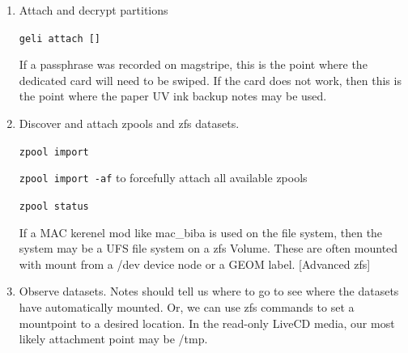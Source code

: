 \begin{enumerate}
If the disks are hardware encrypted, then provide the PIN according to the manufacturer's directions.  Enter the PIN carefully, as there may be administrative reset or disk-wiping functions available.  With the disk hardware decrypted and attached, a message should be visible on the console describing the detection of the device.

\texttt{geom disk list} - should show the disks recognized by the system.

\texttt{gpart show} - should provide an indicator of \gls{partition} numbers

\item Attach and decrypt partitions

\texttt{geli attach []}

If a \gls{passphrase} was recorded on magstripe, this is the point where the dedicated card will need to be swiped.  If the card does not work, then this is the point where the paper UV ink \gls{backup} notes may be used.

\item Discover and attach zpools and \gls{zfs} datasets.

\texttt{zpool import }

\texttt{zpool import -af} to forcefully attach all available zpools

\texttt{zpool status}

If a MAC kerenel mod like mac\_biba is used on the file system, then the system may be a UFS file system on a \gls{zfs} Volume.  These are often mounted with mount from a /dev device node or a GEOM label.  [Advanced \gls{zfs}]

\item Observe datasets.  Notes should tell us where to go to see where the datasets have automatically mounted.    Or, we can use \gls{zfs} commands to set a mountpoint to a desired location.  In the read-only LiveCD media, our most likely attachment point may be /tmp.


\end{enumerate}
